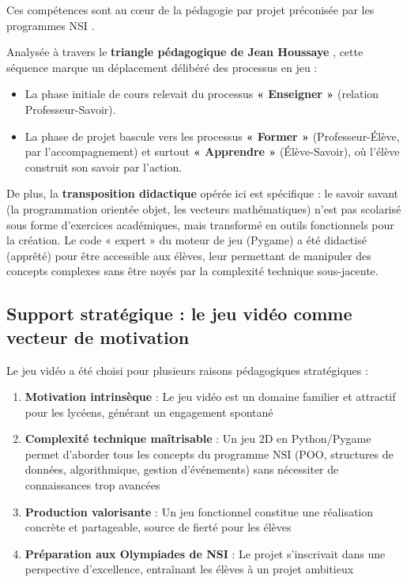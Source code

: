 Ces compétences sont au cœur de la pédagogie par projet préconisée par les programmes NSI \parencite{projet_methode_tlem,nsi_programmes}.

Analysée à travers le \textbf{triangle pédagogique de Jean Houssaye} \parencite{houssaye_triangle}, cette séquence marque un déplacement délibéré des processus en jeu :
\begin{itemize}[leftmargin=*]
    \item La phase initiale de cours relevait du processus \textbf{« Enseigner »} (relation Professeur-Savoir).
    \item La phase de projet bascule vers les processus \textbf{« Former »} (Professeur-Élève, par l'accompagnement) et surtout \textbf{« Apprendre »} (Élève-Savoir), où l'élève construit son savoir par l'action.
\end{itemize}

De plus, la \textbf{transposition didactique} \parencite{chevallard_transposition} opérée ici est spécifique : le savoir savant (la programmation orientée objet, les vecteurs mathématiques) n'est pas scolarisé sous forme d'exercices académiques, mais transformé en outils fonctionnels pour la création. Le code « expert » du moteur de jeu (Pygame) a été didactisé (apprêté) pour être accessible aux élèves, leur permettant de manipuler des concepts complexes sans être noyés par la complexité technique sous-jacente.

\subsection{Support stratégique : le jeu vidéo comme vecteur de motivation}

Le jeu vidéo a été choisi pour plusieurs raisons pédagogiques stratégiques \parencite{pedagogie_active} :

\begin{enumerate}[leftmargin=*]
    \item \textbf{Motivation intrinsèque} : Le jeu vidéo est un domaine familier et attractif pour les lycéens, générant un engagement spontané
    \item \textbf{Complexité technique maîtrisable} : Un jeu 2D en Python/Pygame permet d'aborder tous les concepts du programme NSI (POO, structures de données, algorithmique, gestion d'événements) sans nécessiter de connaissances trop avancées
    \item \textbf{Production valorisante} : Un jeu fonctionnel constitue une réalisation concrète et partageable, source de fierté pour les élèves
    \item \textbf{Préparation aux Olympiades de NSI} : Le projet s'inscrivait dans une perspective d'excellence, entraînant les élèves à un projet ambitieux
\end{enumerate}


